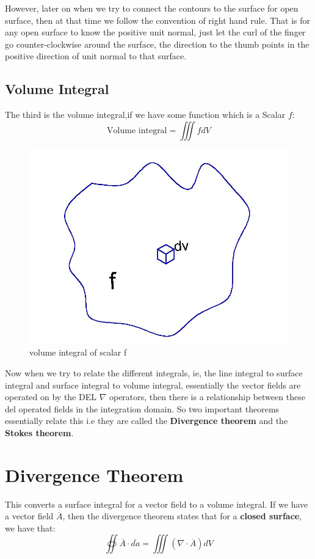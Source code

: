 However, later on when we try to connect the contours to the surface for open surface, then at that time we follow the convention of right hand rule. That is for any open surface to know the positive unit normal, just let the curl of the finger go counter-clockwise around the surface, the direction to the thumb points in the positive direction of unit normal to that surface.

\subsection{Volume Integral}
The third is the volume integral,if we have some function which is a Scalar $f$:
\begin{dmath*}
\text{Volume integral} = \iiint fdV
\end{dmath*}

\begin{figure}
	\centering
	\includegraphics[width=0.7\linewidth]{./graphics/fig175}
	\caption{volume integral of scalar f}
	\label{fig:page-8}
\end{figure}

Now when we try to relate the different integrals, ie, the line integral to surface integral and surface integral to volume integral, essentially the vector fields are operated on by the DEL $\nabla$ operators, then there is a relationship between these del operated fields in the integration domain. So two important theorems essentially relate this i.e they are called the \textbf{Divergence theorem} and the \textbf{Stokes theorem}.

\section{Divergence Theorem}

This converts a surface integral for a vector field to a volume integral. If we have a vector field $\overline{A}$, then the divergence theorem states that for a \textbf{closed surface}, we have that:
\begin{equation}
\oiint \overline{A} \cdot \overline{da} = \iiint (\nabla \cdot \overline{A})dV
\end{equation}

